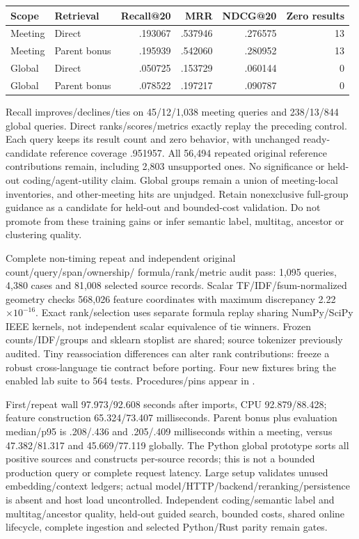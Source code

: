 \documentclass[11pt]{article}
\begin{document}
\begin{center}
\begin{tabular}{llrrrr}
Scope & Retrieval & Recall@20 & MRR & NDCG@20 & Zero results\\
\hline
Meeting & Direct & .193067 & .537946 & .276575 & 13\\
Meeting & Parent bonus & .195939 & .542060 & .280952 & 13\\
Global & Direct & .050725 & .153729 & .060144 & 0\\
Global & Parent bonus & .078522 & .197217 & .090787 & 0\\
\end{tabular}
\end{center}
Recall improves/declines/ties on 45/12/1,038 meeting queries and 238/13/844
global queries. Direct ranks/scores/metrics exactly replay the preceding
control. Each query keeps its result count and zero behavior, with unchanged
ready-candidate reference coverage .951957. All 56,494 repeated original
reference contributions remain, including 2,803 unsupported ones. No
significance or held-out coding/agent-utility claim. Global groups remain a
union of meeting-local inventories, and other-meeting hits are unjudged.
Retain nonexclusive full-group guidance as a candidate for held-out and
bounded-cost validation. Do not promote from these training gains or infer
semantic label, multitag, ancestor or clustering quality.

Complete non-timing repeat and independent original count/query/span/ownership/
formula/rank/metric audit pass: 1,095 queries, 4,380 cases and 81,008 selected
source records. Scalar TF/IDF/fsum-normalized geometry checks 568,026 feature
coordinates with maximum discrepancy 2.22$\times10^{-16}$. Exact rank/selection
uses separate formula replay sharing NumPy/SciPy IEEE kernels, not independent
scalar equivalence of tie winners. Frozen counts/IDF/groups and sklearn
stoplist are shared; source tokenizer previously audited. Tiny reassociation
differences can alter rank contributions: freeze a robust cross-language
tie contract before porting. Four new fixtures bring the enabled lab suite
to 564 tests. Procedures/pins appear in
.

First/repeat wall 97.973/92.608 seconds after imports, CPU 92.879/88.428;
feature construction 65.324/73.407 milliseconds. Parent bonus plus evaluation
median/p95 is .208/.436 and .205/.409 milliseconds within a meeting, versus
47.382/81.317 and 45.669/77.119 globally. The Python global prototype sorts
all positive sources and constructs per-source records; this is not a bounded
production query or complete request latency. Large setup validates unused
embedding/context ledgers; actual model/HTTP/backend/reranking/persistence is
absent and host load uncontrolled. Independent coding/semantic label and
multitag/ancestor quality, held-out guided search, bounded costs, shared online
lifecycle, complete ingestion and selected Python/Rust parity remain gates.
\end{document}
